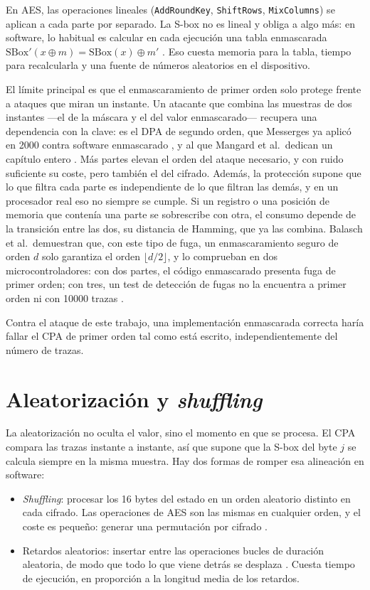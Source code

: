 En AES, las operaciones lineales (\texttt{AddRoundKey}, \texttt{ShiftRows},
\texttt{MixColumns}) se aplican a cada parte por separado. La S-box no es
lineal y obliga a algo más: en software, lo habitual es calcular en cada
ejecución una tabla enmascarada $\mathrm{SBox}'(x \oplus m) = \mathrm{SBox}(x)
\oplus m'$ \cite{herbst2006aes}. Eso cuesta memoria para la
tabla, tiempo para recalcularla y una fuente de números aleatorios en el
dispositivo.

El límite principal es que el enmascaramiento de primer orden solo protege
frente a ataques que miran un instante. Un atacante que combina las muestras de
dos instantes ---el de la máscara y el del valor enmascarado--- recupera una
dependencia con la clave: es el DPA de segundo orden, que Messerges ya aplicó en
2000 contra software enmascarado \cite{messerges2000second}, y al que Mangard
et al.\ dedican un capítulo entero \cite[cap.~10]{mangard2007power}. Más partes elevan
el orden del ataque necesario, y con ruido suficiente su coste, pero también el
del cifrado. Además, la protección supone que lo que filtra cada parte es
independiente de lo que filtran las demás, y en un procesador real eso no
siempre se cumple. Si un registro o una posición de memoria que contenía una
parte se sobrescribe con otra, el consumo depende de la transición entre las
dos, su distancia de Hamming, que ya las combina. Balasch et al.\ demuestran
que, con este tipo de fuga, un enmascaramiento seguro de orden $d$ solo
garantiza el orden $\lfloor d/2 \rfloor$, y lo comprueban en dos
microcontroladores: con dos partes, el código enmascarado presenta fuga de
primer orden; con tres, un test de detección de fugas no la encuentra a primer
orden ni con \num{10000} trazas \cite{balasch2014lazy}.

Contra el ataque de este trabajo, una implementación enmascarada correcta haría
fallar el CPA de primer orden tal como está escrito, independientemente del
número de trazas.

\section{Aleatorización y \emph{shuffling}}
\label{sec:shuffling}

La aleatorización no oculta el valor, sino el momento en que se procesa. El CPA
compara las trazas instante a instante, así que supone que la S-box del byte $j$
se calcula siempre en la misma muestra. Hay dos formas de romper esa
alineación en software:

\begin{itemize}
  \item \emph{Shuffling}: procesar los 16 bytes del estado en un orden
    aleatorio distinto en cada cifrado. Las operaciones de AES son las mismas
    en cualquier orden, y el coste es pequeño: generar una permutación por
    cifrado \cite{herbst2006aes}.
  \item Retardos aleatorios: insertar entre las operaciones bucles de duración
    aleatoria, de modo que todo lo que viene detrás se desplaza
    \cite{clavier2000countermeasures}. Cuesta tiempo de ejecución, en
    proporción a la longitud media de los retardos.
\end{itemize}

